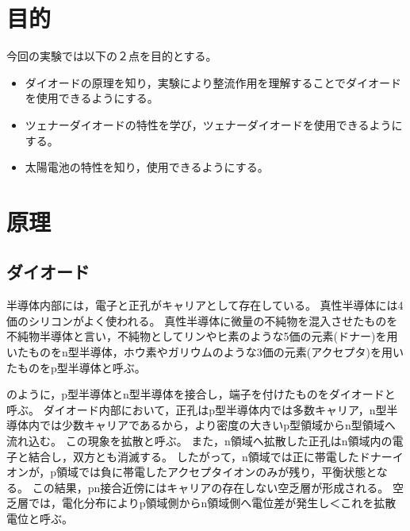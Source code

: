 \documentclass[11pt,dvipdfmx]{jarticle}
\begin{document}
\begin{jikkenTitle}
 \subTitle{} %
 \kyoudou{} %
 \kyoudouII{} %
 \yoteibi{}%
 \yoteibiII{}%
 \yoteibiIII{}%
 \hanNumberName{}{}{} %
\end{jikkenTitle}

\section{目的}
今回の実験では以下の２点を目的とする。
\begin{itemize}
	\item ダイオードの原理を知り，実験により整流作用を理解することでダイオードを使用できるようにする。
	\item ツェナーダイオードの特性を学び，ツェナーダイオードを使用できるようにする。
	\item 太陽電池の特性を知り，使用できるようにする。
\end{itemize}

\section{原理}
\subsection{ダイオード}
半導体内部には，電子と正孔がキャリアとして存在している。
真性半導体には4価のシリコンがよく使われる。
真性半導体に微量の不純物を混入させたものを不純物半導体と言い，不純物としてリンやヒ素のような5価の元素(ドナー)を用いたものをn型半導体，ホウ素やガリウムのような3価の元素(アクセプタ)を用いたものをp型半導体と呼ぶ。

のように，p型半導体とn型半導体を接合し，端子を付けたものをダイオードと呼ぶ。
ダイオード内部において，正孔はp型半導体内では多数キャリア，n型半導体内では少数キャリアであるから，より密度の大きいp型領域からn型領域へ流れ込む。
この現象を拡散と呼ぶ。
また，n領域へ拡散した正孔はn領域内の電子と結合し，双方とも消滅する。
したがって，n領域では正に帯電したドナーイオンが，p領域では負に帯電したアクセプタイオンのみが残り，平衡状態となる。
この結果，pn接合近傍にはキャリアの存在しない空乏層が形成される。
空乏層では，電化分布によりp領域側からn領域側へ電位差が発生し＜これを拡散電位と呼ぶ。
\end{document}
